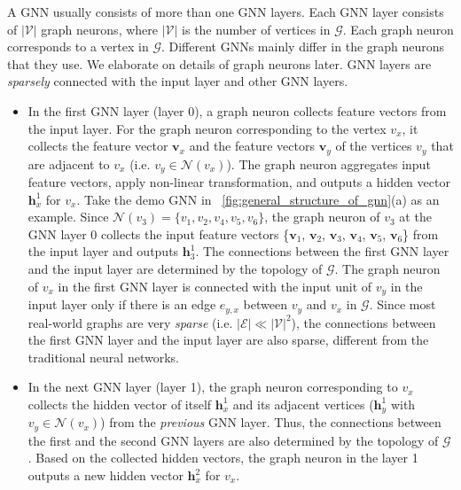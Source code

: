 A GNN usually consists of more than one GNN layers.
%
Each GNN layer consists of $|\mathcal{V}|$ graph neurons, where $|\mathcal{V}|$ is the number of vertices in $\mathcal{G}$.
%
Each graph neuron corresponds to a vertex in $\mathcal{G}$.
%
Different GNNs mainly differ in the graph neurons that they use.
%
We elaborate on details of graph neurons later.
%
GNN layers are \emph{sparsely} connected with the input layer and other GNN layers.
%
\begin{itemize}
    \item In the first GNN layer (layer 0), a graph neuron collects feature vectors from the input layer.
    For the graph neuron corresponding to the vertex $v_x$, it collects the feature vector $\boldsymbol{v}_x$ and the feature vectors $\boldsymbol{v}_y$ of the vertices $v_y$ that are adjacent to $v_x$ (i.e.  $v_y \in \mathcal{N}(v_x)$).
    The graph neuron aggregates input feature vectors, apply non-linear transformation, and outputs a hidden vector $\boldsymbol{h}^1_x$ for $v_x$.
    Take the demo GNN in \figurename~\ref{fig:general_structure_of_gnn}(a) as an example.
    Since $\mathcal{N}(v_3) = \{v_1, v_2, v_4, v_5, v_6\}$, the graph neuron of $v_3$ at the GNN layer 0 collects the input feature vectors \{$\boldsymbol{v}_1$, $\boldsymbol{v}_2$, $\boldsymbol{v}_3$, $\boldsymbol{v}_4$, $\boldsymbol{v}_5$, $\boldsymbol{v}_6$\} from the input layer and outputs $\boldsymbol{h}^1_3$.
    The connections between the first GNN layer and the input layer  are determined by the topology of $\mathcal{G}$.
    The graph neuron of $v_x$ in the first GNN layer is connected with the input unit of $v_y$  in the input layer only if there is an edge $e_{y,x}$ between $v_y$ and $v_x$ in $\mathcal{G}$.
    Since most real-world graphs are very \emph{sparse} (i.e. $|\mathcal{E}| \ll |\mathcal{V}|^2$), the connections between the first GNN layer and the input layer are also sparse, different from the traditional neural networks.
    
    \item In the next GNN layer (layer 1), the graph neuron corresponding to $v_x$ collects the hidden vector of itself $\boldsymbol{h}^1_x$ and its adjacent vertices ($\boldsymbol{h}^1_y$ with $v_y \in \mathcal{N}(v_x)$) from the \emph{previous} GNN layer.
    Thus, the connections between the first and the second GNN layers are also determined by the topology of $\mathcal{G}$.
    Based on the collected hidden vectors, the graph neuron in the layer 1 outputs a new hidden vector $\boldsymbol{h}^2_x$ for $v_x$.
   

\end{itemize}
